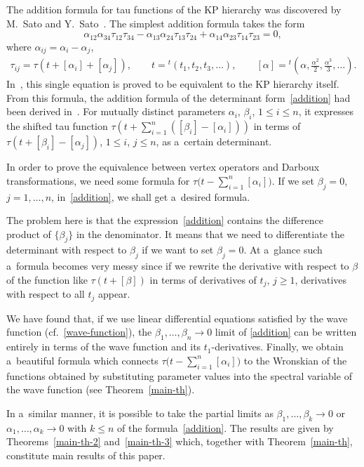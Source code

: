 \documentclass[10pt,a4paper]{amsart}
\numberwithin{equation}{section}
\theoremstyle{definition}
\begin{document}
The addition formula for tau functions of the KP hierarchy was discovered by M.~Sato and Y.~Sato~\cite{SS}. The simplest addition formula takes the form
\[
\alpha_{12}\alpha_{34}
\tau_{12}\tau_{34}
-
\alpha_{13}\alpha_{24}\tau_{13}\tau_{24}
+
\alpha_{14}\alpha_{23}\tau_{14}\tau_{23}
=0,
\]
where $\alpha_{ij}=\alpha_i-\alpha_j$,
\begin{gather*}
\tau_{ij}=\tau(t+[\alpha_i]+[\alpha_j]),
\qquad
t={}^t(t_1,t_2,t_3,\dots ),
\qquad
[\alpha]={}^t\left(\alpha,\frac{\alpha^2}{2},\frac{\alpha^3}{3},\dots \right).
\end{gather*}
In~\cite{Shigyo2013,Takasaki-Takebe1995}, this single equation is proved to be equivalent to the
KP hierarchy itself. From this formula, the addition formula of the determinant form~\eqref{addition} had been derived in~\cite{Shigyo2013}.
For mutually distinct parameters $\alpha_i$, $\beta_i$, $1\leq i\leq n$, it expresses
the shifted tau function $ \tau(t+\sum_{i=1}^n([\beta_i]-[\alpha_i]))$ in terms of $\tau(t+[\beta_i]-[\alpha_j])$, $1\leq i$, $j\leq n$, as a~certain determinant.

In order to prove the equivalence between vertex operators and Darboux
transformations, we need some formula for
$ \tau\bigl(t-\sum_{i=1}^n[\alpha_i]\bigr)$.
If we set $\beta_j=0$, $j=1,\dots ,n$, in~\eqref{addition}, we shall get a~desired formula.

The problem here is that the expression~\eqref{addition} contains
the difference product of $\{\beta_j\}$ in the denominator.
It means that we need to differentiate the determinant with respect to $\beta_j$ if we want to set
$\beta_j=0$. At a~glance such a~formula becomes very messy since if we rewrite the derivative
with respect to $\beta$ of the function like $\tau(t+[\beta])$ in terms of
 derivatives of $t_j$, $j\geq 1$,
derivatives with respect to all $t_j$ appear.

We have found that, if we use linear differential equations satisfied
by the wave function (cf.~\eqref{wave-function}), the
$\beta_1,\dots ,\beta_n\to 0$ limit of
 \eqref{addition} can be written
entirely in terms of the wave function and its $t_1$-derivatives.
Finally, we obtain a~beautiful formula which connects $ \tau\bigl(t-\sum_{i=1}^n[\alpha_i]\bigr)$ to the Wronskian of the functions obtained by substituting parameter values into the spectral variable
of the wave function (see Theorem~\ref{main-th}).

In a~similar manner, it is possible to take
the partial limits as
$\beta_1,\dots ,\beta_k\to 0$ or $\alpha_1,\dots ,\alpha_k\to 0$ with $k\leq n$ of
the formula~\eqref{addition}.
The results are given by Theorems~\ref{main-th-2} and~\ref{main-th-3} which, together with Theorem~\ref{main-th}, constitute main results of this paper.
\end{document}
